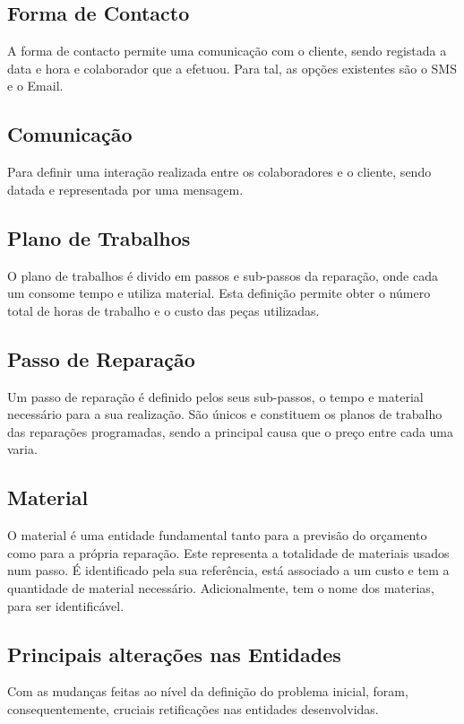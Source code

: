 \documentclass[a4paper,12pt]{scrreprt}
\begin{document}
\subsection{Forma de Contacto} \label{ent_formas-contacto}
A forma de contacto permite uma comunicação com o cliente, sendo registada a data e hora e colaborador que a efetuou.
Para tal, as opções existentes são o SMS e o Email.

\subsection{Comunicação} \label{ent_comunic}
Para definir uma interação realizada entre os colaboradores e o cliente, sendo datada e representada por uma mensagem.

\subsection{Plano de Trabalhos} \label{ent_plano-de-trabalhos}
O plano de trabalhos é divido em passos e sub-passos da reparação, onde cada um consome tempo e utiliza material. 
Esta definição permite obter o número total de horas de trabalho e o custo das peças utilizadas. 

\subsection{Passo de Reparação} \label{ent_passo_rep}
Um passo de reparação é definido pelos seus sub-passos, o tempo e material necessário para a sua realização.
São únicos e constituem os planos de trabalho das reparações programadas, sendo a principal causa que o preço 
entre cada uma varia.

\subsection{Material} \label{ent_material}
O material é uma entidade fundamental tanto para a previsão do orçamento como para a própria reparação.
Este representa a totalidade de materiais usados num passo. 
É identificado pela sua referência, está associado a um custo e tem a quantidade de material necessário. Adicionalmente,
tem o nome dos materias, para ser identificável.

\subsection{Principais alterações nas Entidades}
Com as mudanças feitas ao nível da definição do problema inicial, foram, consequentemente, cruciais retificações nas entidades
desenvolvidas.
\end{document}
